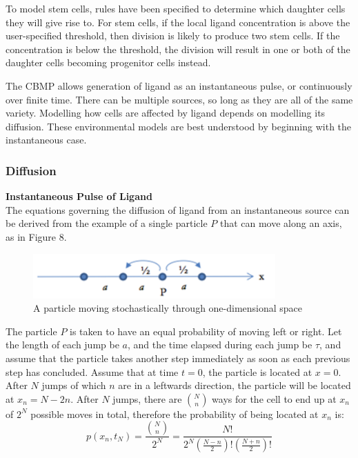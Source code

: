\documentclass[12pt]{article}
\begin{document}
To model stem cells, rules have been specified to determine which 
daughter cells they will give rise to. For stem cells, if the local 
ligand concentration is above the user-specified threshold, then 
division is likely to produce two stem cells. If the concentration is 
below the threshold, the division will result in one or both of the 
daughter cells becoming progenitor cells instead.

The CBMP allows generation of ligand as an instantaneous pulse, or 
continuously over finite time. There can be multiple sources, so long as 
they are all of the same variety. Modelling how cells are affected by 
ligand depends on modelling its diffusion. These environmental 
models are best understood by beginning with the instantaneous case.

\subsubsection{Diffusion}
{\bfseries Instantaneous Pulse of Ligand} \\
The equations governing the diffusion of ligand from an instantaneous 
source can be derived from the example of a single particle \(P\) that can 
move along an axis, as in Figure 8.

\begin{figure}[H]
\centering
\includegraphics[width=9.28cm]{media/particlep.png}
\caption[]{A particle moving stochastically through 
one-dimensional space}
\end{figure}

The particle \(P\) is taken to have an equal probability of 
moving left or right. Let the length of each jump be \(a\), and 
the time elapsed during each jump be \(\tau\), and assume that 
the particle takes another step immediately as soon as each previous 
step has concluded. Assume that at time 
\(t=0\), the particle is located at \(x=0\). After \(N\) jumps of which \(n\) are in a 
leftwards direction, the particle will be located at \(x_n = N-2n\). 
After \(N\) jumps, there are \(\binom{N}{n}\) ways 
for the cell to end up at \(x_n\) of \(2^N\) possible moves in 
total, therefore the probability of being located at \(x_n\) is:
\begin{equation} 
  p(x_n,t_N) = \frac{\binom{N}{n}}{2^N} = \frac{N!}{2^N(\frac{N-n}{2})!(\frac{N+n}{2})!}
\end{equation}
\end{document}
